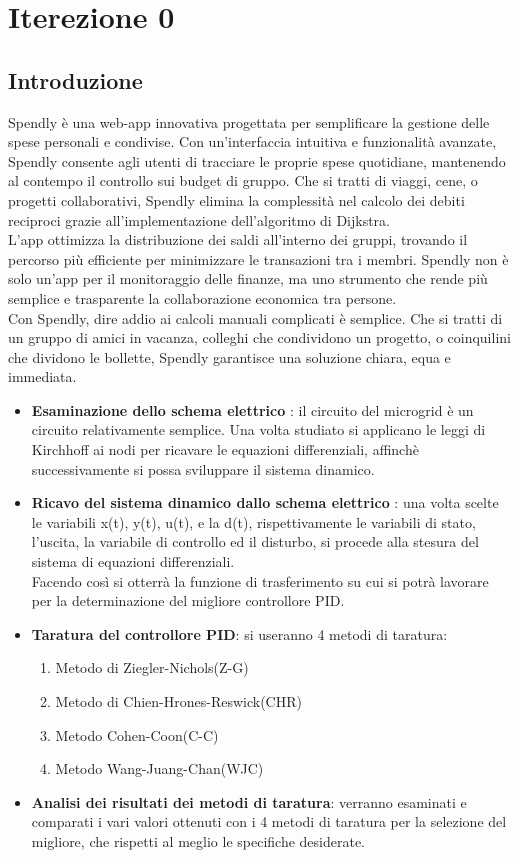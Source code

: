\chapter{Iterezione 0}
\section{Introduzione}
Spendly è una web-app innovativa progettata per semplificare la gestione delle spese personali e condivise. Con un’interfaccia intuitiva e funzionalità avanzate, Spendly consente agli utenti di tracciare le proprie spese quotidiane, mantenendo al contempo il controllo sui budget di gruppo. Che si tratti di viaggi, cene, o progetti collaborativi, Spendly elimina la complessità nel calcolo dei debiti reciproci grazie all'implementazione dell'algoritmo di Dijkstra.
\\
L'app ottimizza la distribuzione dei saldi all'interno dei gruppi, trovando il percorso più efficiente per minimizzare le transazioni tra i membri. Spendly non è solo un’app per il monitoraggio delle finanze, ma uno strumento che rende più semplice e trasparente la collaborazione economica tra persone.
\\
Con Spendly, dire addio ai calcoli manuali complicati è semplice. Che si tratti di un gruppo di amici in vacanza, colleghi che condividono un progetto, o coinquilini che dividono le bollette, Spendly garantisce una soluzione chiara, equa e immediata.

\begin{itemize}
    \item \textbf{Esaminazione dello schema elettrico} : il circuito del microgrid è un circuito relativamente semplice. Una volta studiato si applicano le leggi di Kirchhoff ai nodi per ricavare le equazioni differenziali, affinchè successivamente si possa sviluppare il sistema dinamico. 
    \item \textbf{Ricavo del sistema dinamico dallo schema elettrico }: una volta scelte le variabili x(t), y(t), u(t), e la d(t), rispettivamente le variabili di stato, l'uscita, la variabile di controllo ed il disturbo, si procede alla stesura del sistema di equazioni differenziali. \\Facendo così si otterrà la funzione di trasferimento su cui si potrà lavorare per la determinazione del migliore controllore PID.
    \item \textbf{Taratura del controllore PID}: si useranno 4 metodi di taratura:\begin{enumerate}
        \item Metodo di Ziegler-Nichols(Z-G)
        \item Metodo di Chien-Hrones-Reswick(CHR)
        \item Metodo Cohen-Coon(C-C)
        \item Metodo Wang-Juang-Chan(WJC)
    \end{enumerate}
    \item \textbf{Analisi dei risultati dei metodi di taratura}: verranno esaminati e comparati i vari valori ottenuti con i 4 metodi di taratura per la selezione del migliore, che rispetti al meglio le specifiche desiderate.
\end{itemize}

